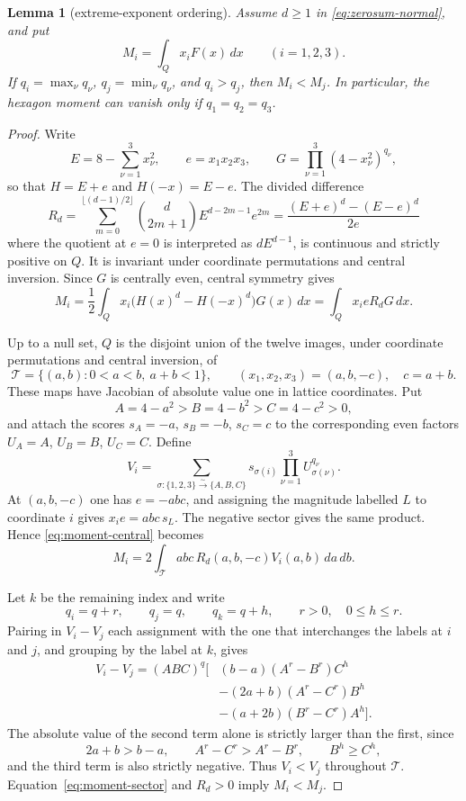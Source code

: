 \documentclass[11pt]{amsart}
\newtheorem{lemma}[theorem]{Lemma}
\theoremstyle{definition}
\theoremstyle{remark}
\begin{document}
\begin{lemma}[extreme-exponent ordering]\label{lem:moment-order}
Assume $d\ge1$ in \eqref{eq:zerosum-normal}, and put
\[
 M_i=\int_Qx_iF(x)\,dx\qquad(i=1,2,3).
\]
If $q_i=\max_\nu q_\nu$, $q_j=\min_\nu q_\nu$, and $q_i>q_j$, then
$M_i<M_j$. In particular, the hexagon moment can vanish only if
$q_1=q_2=q_3$.
\end{lemma}

\begin{proof}
Write
\[
 E=8-\sum_{\nu=1}^3x_\nu^2,\qquad e=x_1x_2x_3,
 \qquad G=\prod_{\nu=1}^3(4-x_\nu^2)^{q_\nu},
\]
so that $H=E+e$ and $H(-x)=E-e$. The divided difference
\[
 R_d=\sum_{m=0}^{\lfloor(d-1)/2\rfloor}
 \binom d{2m+1}E^{d-2m-1}e^{2m}
 =\frac{(E+e)^d-(E-e)^d}{2e}
\]
where the quotient at $e=0$ is interpreted as $dE^{d-1}$, is continuous
and strictly positive on $Q$. It is invariant under coordinate permutations
and central inversion. Since $G$ is centrally even, central symmetry gives
\begin{equation}\label{eq:moment-central}
 M_i=\frac12\int_Qx_i\bigl(H(x)^d-H(-x)^d\bigr)G(x)\,dx
 =\int_Qx_ieR_dG\,dx.
\end{equation}

Up to a null set, $Q$ is the disjoint union of the twelve images, under
coordinate permutations and central inversion, of
\[
 \mathcal T=\{(a,b):0<a<b,\ a+b<1\},\qquad
 (x_1,x_2,x_3)=(a,b,-c),\quad c=a+b.
\]
These maps have Jacobian of absolute value one in lattice coordinates.
Put
\[
 A=4-a^2>B=4-b^2>C=4-c^2>0,
\]
and attach the scores $s_A=-a$, $s_B=-b$, $s_C=c$ to the corresponding
even factors $U_A=A$, $U_B=B$, $U_C=C$. Define
\[
 V_i=\sum_{\sigma:\{1,2,3\}\overset{\sim}{\longrightarrow}\{A,B,C\}}
 s_{\sigma(i)}\prod_{\nu=1}^3U_{\sigma(\nu)}^{q_\nu}.
\]
At $(a,b,-c)$ one has $e=-abc$, and assigning the magnitude labelled
$L$ to coordinate $i$ gives $x_ie=abc\,s_L$. The negative sector gives
the same product. Hence \eqref{eq:moment-central} becomes
\begin{equation}\label{eq:moment-sector}
 M_i=2\int_{\mathcal T}abc\,R_d(a,b,-c)V_i(a,b)\,da\,db.
\end{equation}

Let $k$ be the remaining index and write
\[
 q_i=q+r,\qquad q_j=q,\qquad q_k=q+h,
 \qquad r>0,\quad 0\le h\le r.
\]
Pairing in $V_i-V_j$ each assignment with the one that interchanges the
labels at $i$ and $j$, and grouping by the label at $k$, gives
\begin{align*}
 V_i-V_j=(ABC)^q\bigl[{}
 &(b-a)(A^r-B^r)C^h\\
 &-(2a+b)(A^r-C^r)B^h\\
 &-(a+2b)(B^r-C^r)A^h\bigr].
\end{align*}
The absolute value of the second term alone is strictly larger than the
first, since
\[
 2a+b>b-a,\qquad A^r-C^r>A^r-B^r,\qquad B^h\ge C^h,
\]
and the third term is also strictly negative. Thus $V_i<V_j$ throughout
$\mathcal T$. Equation~\eqref{eq:moment-sector} and $R_d>0$ imply
$M_i<M_j$.
\end{proof}
\end{document}
